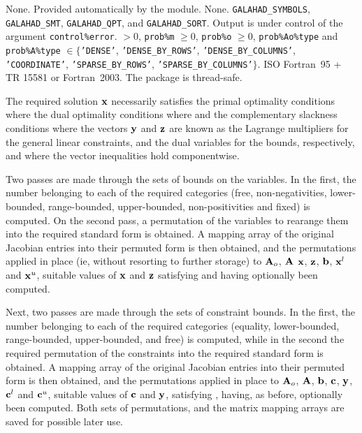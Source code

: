 \documentclass{galahad}
\begin{document}
\galgeneral

\galcommon None.
\galworkspace Provided automatically by the module.
\galroutines None.
\galmodules
{\tt GALAHAD\_SY\-M\-BOLS},
{\tt GALAHAD\_SMT},
{\tt GALAHAD\_QPT},
and {\tt GALAHAD\_SORT}.
\galio Output is under control of the argument {\tt control\%error}.
 $> 0$, {\tt prob\%m} $\geq  0$,
 {\tt prob\%o} $\geq  0$,
 {\tt prob\%Ao\%type} and {\tt prob\%A\%type} $\in \{${\tt 'DENSE'},
 {\tt 'DENSE\_BY\_ROWS'},  {\tt 'DENSE\_BY\_COLUMNS'},
 {\tt 'COORDINATE'}, {\tt 'SPARSE\_BY\_ROWS'},
 {\tt 'SPARSE\_BY\_COLUMNS'}$\}$.
\galportability ISO Fortran~95 + TR 15581 or Fortran~2003.
The package is thread-safe.


\galmethod
The required solution ${\mathbf{x}}$ necessarily satisfies
the primal optimality conditions
where
the dual optimality conditions
where
and the complementary slackness conditions
where the vectors ${\mathbf{y}}$ and ${\mathbf{z}}$ are
known as the Lagrange multipliers for
the general linear constraints, and the dual variables for the bounds,
respectively, and where the vector inequalities hold componentwise.

Two passes are made through the sets of bounds on the variables.
In the first, the number belonging to each of the required categories
(free, non-negativities, lower-bounded, range-bounded,
upper-bounded, non-positivities and fixed) is computed. On the second pass, a
permutation of the variables to rearange them into the required standard form
is obtained. A mapping array of the original Jacobian entries into their
permuted form is then obtained, and the permutations applied in place
(ie, without resorting to further storage) to ${\mathbf{A}}_o$, ${\mathbf{A}}$ ${\mathbf{x}}$, ${\mathbf{z}}$,
${\mathbf{b}}$,
${\mathbf{x}}^l$ and ${\mathbf{x}}^u$, suitable values of ${\mathbf{x}}$ and ${\mathbf{z}}$
satisfying  and  having optionally been computed.

Next, two passes are made through the sets of constraint bounds.
In the first, the number belonging to each of the required categories
(equality, lower-bounded, range-bounded,
upper-bounded, and free) is computed, while in the
second the required permutation of the constraints
into the required standard form is obtained.
A mapping array of the original Jacobian entries into their
permuted form is then obtained, and the permutations applied in place
to ${\mathbf{A}}_o$, ${\mathbf{A}}$, ${\mathbf{b}}$, ${\mathbf{c}}$, ${\mathbf{y}}$, ${\mathbf{c}}^l$ and ${\mathbf{c}}^u$,
suitable values of ${\mathbf{c}}$ and ${\mathbf{y}}$, satisfying ,
having, as before, optionally been computed.
Both sets of permutations, and the matrix mapping arrays are saved for
possible later use.
\end{document}

